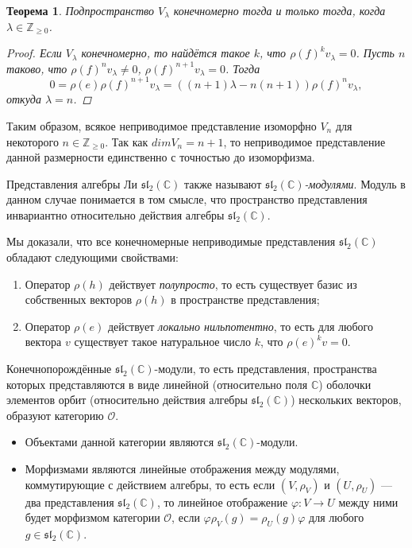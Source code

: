 \documentclass[12pt]{article}
\newtheorem{theorem}{Теорема}[]
\theoremstyle{definition}
\begin{document}
\begin{theorem}
    Подпространство $V_{\lambda}$ конечномерно тогда и только тогда, когда $\lambda \in \mathbb{Z}_{\ge 0}$.
    \begin{proof}
        Если $V_{\lambda}$ конечномерно, то найдётся такое $k$, что $\rho(f) ^ k v_{\lambda} = 0$. Пусть $n$ таково, что $\rho(f) ^ n v_{\lambda} \ne 0$, $\rho(f) ^ {n+1} v_{\lambda} = 0$. Тогда
        $$ 0 = \rho(e) \rho(f) ^ {n+1} v_{\lambda} = ((n+1) \lambda - n (n+1)) \rho(f) ^ n v_{\lambda}, $$
        откуда $\lambda = n$.
    \end{proof}
\end{theorem}

Таким образом, всякое неприводимое представление изоморфно $V_n$ для некоторого $n \in \mathbb{Z}_{\ge 0}$. Так как $dim V_n = n + 1$, то неприводимое представление данной размерности единственно с точностью до изоморфизма.

Представления алгебры Ли $\mathfrak{sl_2}(\mathbb{C})$ также называют \textit{$\mathfrak{sl_2}(\mathbb{C})$-модулями}. Модуль в данном случае понимается в том смысле, что пространство представления инвариантно относительно действия алгебры $\mathfrak{sl_2}(\mathbb{C})$.

Мы доказали, что все конечномерные неприводимые представления $\mathfrak{sl_2}(\mathbb{C})$ обладают следующими свойствами:
\begin{enumerate}
    \item Оператор $\rho(h)$ действует \textit{полупросто}, то есть существует базис из собственных векторов $\rho(h)$ в пространстве представления;
    \item Оператор $\rho(e)$ действует \textit{локально нильпотентно}, то есть для любого вектора $v$ существует такое натуральное число $k$, что $\rho(e) ^ k v = 0$.
\end{enumerate}

Конечнопорождённые $\mathfrak{sl_2}(\mathbb{C})$-модули, то есть представления, пространства которых представляются в виде линейной (относительно поля $\mathbb{C}$) оболочки элементов орбит (относительно действия алгебры $\mathfrak{sl_2}(\mathbb{C})$) нескольких векторов, образуют категорию $\mathcal{O}$.

\begin{itemize}
    \item Объектами данной категории являются $\mathfrak{sl_2}(\mathbb{C})$-модули.
    \item Морфизмами являются линейные отображения между модулями, коммутирующие с действием алгебры, то есть если $(V, \rho_V)$ и $(U, \rho_U)$ --- два представления $\mathfrak{sl_2}(\mathbb{C})$, то линейное отображение $\varphi : V \rightarrow U$ между ними будет морфизмом категории $\mathcal{O}$, если $\varphi \rho_V(g) = \rho_U(g) \varphi$ для любого $g \in \mathfrak{sl_2}(\mathbb{C})$.
\end{itemize}
\end{document}

